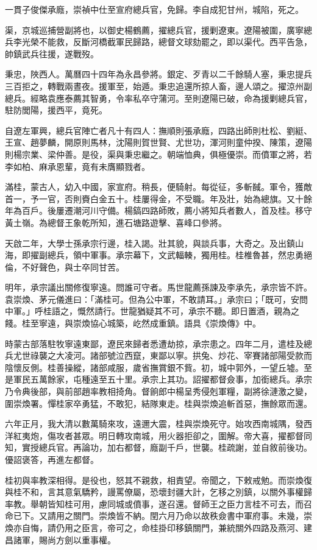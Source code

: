 \begin{pinyinscope}
一貫子俊傑承廕，崇禎中仕至宣府總兵官，免歸。李自成犯甘州，城陷，死之。

渠，京城巡捕營副將也，以御史楊鶴薦，擢總兵官，援剿遼東。遼陽被圍，廣寧總兵李光榮不能救，反斷河橋截軍民歸路，總督文球劾罷之，即以渠代。西平告急，帥鎮武兵往援，遂戰歿。

秉忠，陜西人。萬曆四十四年為永昌參將。銀定、歹青以二千餘騎人塞，秉忠提兵三百拒之，轉戰兩晝夜。援軍至，始遁。秉忠追還所掠人畜，邊人頌之。擢涼州副總兵。經略袁應泰薦其智勇，令率私卒守蒲河。至則遼陽已破，命為援剿總兵官，駐防閭陽，援西平，竟死。

自遼左軍興，總兵官陣亡者凡十有四人：撫順則張承廕，四路出師則杜松、劉綎、王宣、趙夢麟，開原則馬林，沈陽則賀世賢、尤世功，渾河則童仲揆、陳策，遼陽則楊宗業、梁仲善。是役，渠與秉忠繼之。朝端恤典，俱極優崇。而僨軍之將，若李如柏、麻承恩輩，竟有未膺顯戮者。

滿桂，蒙古人，幼入中國，家宣府。稍長，便騎射。每從征，多斬馘。軍令，獲敵首一，予一官，否則賚白金五十。桂屢得金，不受職。年及壯，始為總旗。又十餘年為百戶。後屢遷潮河川守備。楊鎬四路師敗，薦小將知兵者數人，首及桂。移守黃土嶺。為總督王象乾所知，進石塘路遊擊、喜峰口參將。

天啟二年，大學士孫承宗行邊，桂入謁。壯其貌，與談兵事，大奇之。及出鎮山海，即擢副總兵，領中軍事。承宗幕下，文武輻輳，獨用桂。桂椎魯甚，然忠勇絕倫，不好聲色，與士卒同甘苦。

明年，承宗議出關修復寧遠。問誰可守者。馬世龍薦孫諫及李承先，承宗皆不許。袁崇煥、茅元儀進曰：「滿桂可。但為公中軍，不敢請耳。」承宗曰；「既可，安問中軍。」呼桂語之，慨然請行。世龍猶疑其不可，承宗不聽。即日置酒，親為之餞。桂至寧遠，與崇煥協心城築，屹然成重鎮。語具《崇煥傳》中。

時蒙古部落駐牧寧遠東鄙，遼民來歸者悉遭劫掠，承宗患之。四年二月，遣桂及總兵尤世祿襲之大凌河。諸部號泣西竄，東鄙以寧。拱兔、炒花、宰賽諸部陽受款而陰懷反側。桂善操縱，諸部咸服，歲省撫賞銀不貲。初，城中郭外，一望丘墟。至是軍民五萬餘家，屯種遠至五十里。承宗上其功。詔擢都督僉事，加銜總兵。承宗乃令典後部，與前部趙率教相掎角。督餉郎中楊呈秀侵剋軍糧，副將徐漣激之變，圍崇煥署。憚桂家卒勇猛，不敢犯，結隊東走。桂與崇煥追斬首惡，撫餘眾而還。

六年正月，我大清以數萬騎來攻，遠邇大震，桂與崇煥死守。始攻西南城隅，發西洋紅夷炮，傷攻者甚眾。明日轉攻南城，用火器拒卻之，圍解。帝大喜，擢都督同知，實授總兵官。再論功，加右都督，廕副千戶，世襲。桂疏謝，並自敘前後功。優詔褒答，再進左都督。

桂初與率教深相得。是役也，怒其不親救，相責望。帝聞之，下敕戒勉。而崇煥復與桂不和，言其意氣驕矜，謾罵僚屬，恐壞封疆大計，乞移之別鎮，以關外事權歸率教。舉朝皆知桂可用，慮同城或僨事，遂召還。督師王之臣力言桂不可去，而召命已下。又請用之關門。崇煥皆不納。閏六月乃命以故秩僉書中軍府事。未幾，崇煥亦自悔，請仍用之臣言，帝可之，命桂掛印移鎮關門，兼統關外四路及燕河、建昌諸軍，賜尚方劍以重事權。


\end{pinyinscope}
